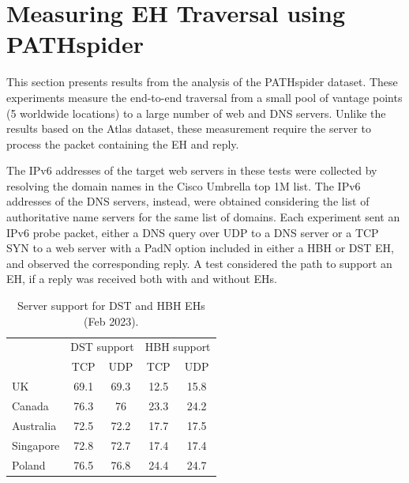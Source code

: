 \documentclass[conference]{IEEEtran}
\begin{document}
\section{Measuring EH Traversal using PATHspider} 
\label{sec:pathspider-results}

This section presents results from the analysis of the PATHspider dataset.
These experiments measure the end-to-end traversal from a small
pool of vantage points (5 worldwide locations) to a large number of web and
DNS servers.  Unlike the results based on the Atlas dataset, these
measurement require the server to process the packet containing the EH and
reply.

The IPv6 addresses of the target web servers in these tests were collected by
resolving the domain names in the Cisco Umbrella top 1M list. The IPv6
addresses of the DNS servers, instead, were obtained considering the list of
authoritative name servers for the same list of domains.
Each experiment sent an IPv6 probe packet, either a DNS
query over UDP to a DNS server or a TCP SYN to a web server with a PadN option
included in either a HBH or DST EH, and observed the
corresponding reply.  A test considered the path to support an EH, if a reply was received
both with and without EHs. 


\begin{table} 
\centering
\caption{Server support for DST and HBH EHs (Feb 2023). }
\begin{tabular}{p{1.5cm}|cc|cc}
\multicolumn{1}{l|}{} & \multicolumn{2}{p{2cm}|}{\centering DST support} 
                      & \multicolumn{2}{p{2cm}}{\centering HBH support} \\ \cline{2-5} 
\multicolumn{1}{l|}{} & \multicolumn{1}{c|}{TCP}   & UDP      & \multicolumn{1}{c|}{TCP}     & UDP   \\ \hline \hline
UK                    & \multicolumn{1}{c|}{69.1}  & 69.3     & \multicolumn{1}{c|}{12.5}    & 15.8  \\ \hline
Canada                & \multicolumn{1}{c|}{76.3}  & 76       & \multicolumn{1}{c|}{23.3}    & 24.2  \\ \hline
Australia             & \multicolumn{1}{c|}{72.5}  & 72.2     & \multicolumn{1}{c|}{17.7}    & 17.5  \\ \hline
Singapore             & \multicolumn{1}{c|}{72.8}  & 72.7     & \multicolumn{1}{c|}{17.4}    & 17.4  \\ \hline
Poland                & \multicolumn{1}{c|}{76.5}  & 76.8     & \multicolumn{1}{c|}{24.4}    & 24.7   
\end{tabular}
\label{tbl:e2e_traversal}
\end{table}
\end{document}
